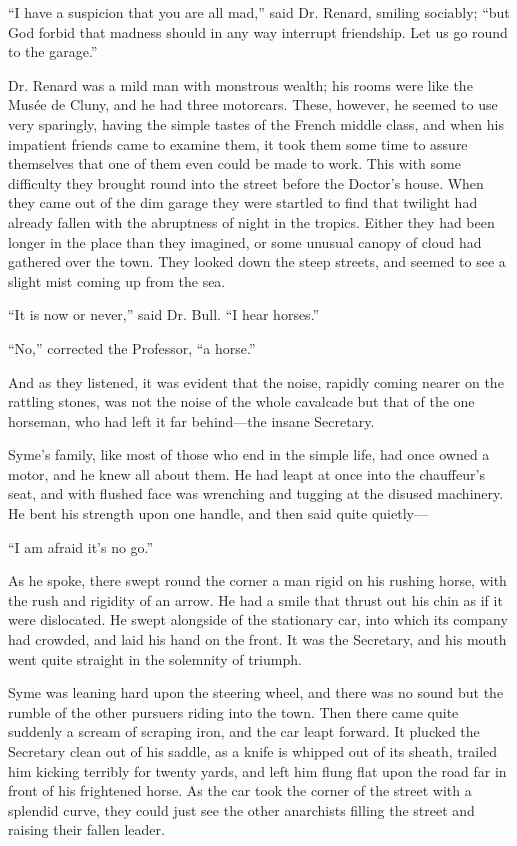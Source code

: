 “I have a suspicion that you are all mad,” said Dr. Renard, smiling sociably; “but God forbid that madness should in any way interrupt friendship. Let us go round to the garage.”

Dr. Renard was a mild man with monstrous wealth; his rooms were like the Musée de Cluny, and he had three motorcars. These, however, he seemed to use very sparingly, having the simple tastes of the French middle class, and when his impatient friends came to examine them, it took them some time to assure themselves that one of them even could be made to work. This with some difficulty they brought round into the street before the Doctor’s house. When they came out of the dim garage they were startled to find that twilight had already fallen with the abruptness of night in the tropics. Either they had been longer in the place than they imagined, or some unusual canopy of cloud had gathered over the town. They looked down the steep streets, and seemed to see a slight mist coming up from the sea.

“It is now or never,” said Dr. Bull. “I hear horses.”

“No,” corrected the Professor, “a horse.”

And as they listened, it was evident that the noise, rapidly coming nearer on the rattling stones, was not the noise of the whole cavalcade but that of the one horseman, who had left it far behind⁠—the insane Secretary.

Syme’s family, like most of those who end in the simple life, had once owned a motor, and he knew all about them. He had leapt at once into the chauffeur’s seat, and with flushed face was wrenching and tugging at the disused machinery. He bent his strength upon one handle, and then said quite quietly⁠—

“I am afraid it’s no go.”

As he spoke, there swept round the corner a man rigid on his rushing horse, with the rush and rigidity of an arrow. He had a smile that thrust out his chin as if it were dislocated. He swept alongside of the stationary car, into which its company had crowded, and laid his hand on the front. It was the Secretary, and his mouth went quite straight in the solemnity of triumph.

Syme was leaning hard upon the steering wheel, and there was no sound but the rumble of the other pursuers riding into the town. Then there came quite suddenly a scream of scraping iron, and the car leapt forward. It plucked the Secretary clean out of his saddle, as a knife is whipped out of its sheath, trailed him kicking terribly for twenty yards, and left him flung flat upon the road far in front of his frightened horse. As the car took the corner of the street with a splendid curve, they could just see the other anarchists filling the street and raising their fallen leader.

